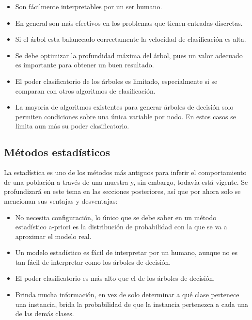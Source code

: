 \documentclass[a4paper, 11pt, oneside]{report}
\begin{document}
	\begin{itemize}
	
	\item Son fácilmente interpretables por un ser humano.

	\item En general son más efectivos en los problemas que tienen entradas discretas.
	
	\item Si el árbol esta balanceado correctamente la velocidad de clasificación es alta.
	
	\item Se debe optimizar la profundidad máxima del árbol, pues un valor adecuado es importante para obtener un buen resultado.
	
	\item El poder clasificatorio de los árboles es limitado, especialmente si se comparan con otros algoritmos de clasificación.
	
	\item La mayoría de algoritmos existentes para generar árboles de decisión solo permiten condiciones sobre una única variable por nodo. En estos casos se limita aun más su poder clasificatorio. 

	\end{itemize}

\subsection{Métodos estadísticos}

La estadística es uno de los métodos más antiguos para inferir el comportamiento de una población a través de una muestra y, sin embargo, todavía está vigente. Se profundizará en este tema en las secciones posteriores, así que por ahora solo se mencionan sus ventajas y desventajas:

	\begin{itemize}

	\item No necesita configuración, lo único que se debe saber en un método estadístico a-priori es la distribución de probabilidad con la que se va a aproximar el modelo real.

	\item Un modelo estadístico es fácil de interpretar por un humano, aunque no es tan fácil de interpretar como los árboles de decisión.

	\item El poder clasificatorio es más alto que el de los árboles de decisión.

	\item Brinda mucha información, en vez de solo determinar a qué clase pertenece una instancia, brida la probabilidad de que la instancia pertenezca a cada una de las demás clases.
	
	\end{itemize}
	
\end{document}

